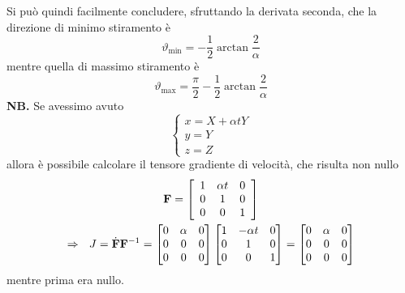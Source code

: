 \documentclass[10pt,a4paper,twoside]{book}
\begin{document}
Si può quindi facilmente concludere, sfruttando la derivata seconda, che la direzione di minimo stiramento è
\begin{equation*}
\vartheta _{\text{min}} =-\frac{1}{2}\arctan\frac{2}{\alpha }
\end{equation*}
mentre quella di massimo stiramento è
\begin{equation*}
\vartheta _{\text{max}} =\frac{\pi }{2} -\frac{1}{2}\arctan\frac{2}{\alpha }
\end{equation*}
\textbf{NB.} Se avessimo avuto
\begin{equation*}
\begin{cases}
x=X+\alpha tY\\
y=Y\\
z=Z
\end{cases}
\end{equation*}
allora è possibile calcolare il tensore gradiente di velocità, che risulta non nullo
\begin{gather*}
\mathbf{F} =\left[\begin{array}{ c c c }
1 & \alpha t & 0\\
0 & 1 & 0\\
0 & 0 & 1
\end{array}\right]\\
\Rightarrow \ \ J=\dot{\mathbf{F}}\mathbf{F}^{-1} =\begin{bmatrix}
0 & \alpha  & 0\\
0 & 0 & 0\\
0 & 0 & 0
\end{bmatrix}\begin{bmatrix}
1 & -\alpha t & 0\\
0 & 1 & 0\\
0 & 0 & 1
\end{bmatrix} =\begin{bmatrix}
0 & \alpha  & 0\\
0 & 0 & 0\\
0 & 0 & 0
\end{bmatrix}
\end{gather*}
mentre prima era nullo.
\end{document}

